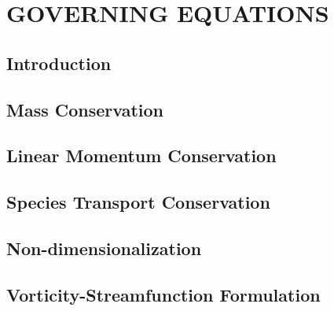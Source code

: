 \chapter{\textbf{GOVERNING EQUATIONS}}
\label{eqgov}

\section{\textbf{Introduction}} 

\label{intro equacoes de governo}

\section{\textbf{Mass Conservation}} 
\label{conservacao massa}



\section{\textbf{Linear Momentum Conservation}} 
\label{conservacao movimento}



\section{\textbf{Species Transport Conservation}} 
\label{conservacao especie}



\section{\textbf{Non-dimensionalization}} 
\label{adimensionalizacao}



\section{\textbf{Vorticity-Streamfunction Formulation}} 
\label{corrente vorticidade}



